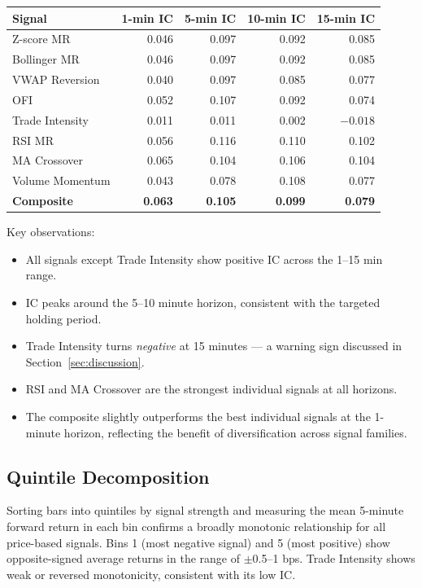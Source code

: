 \documentclass[11pt, a4paper]{article}
\begin{document}
\begin{center}
\begin{tabular}{lrrrr}
\toprule
\textbf{Signal} & \textbf{1-min IC} & \textbf{5-min IC}
  & \textbf{10-min IC} & \textbf{15-min IC} \\
\midrule
Z-score MR       & 0.046 & 0.097 & 0.092 & 0.085 \\
Bollinger MR     & 0.046 & 0.097 & 0.092 & 0.085 \\
VWAP Reversion   & 0.040 & 0.097 & 0.085 & 0.077 \\
OFI              & 0.052 & 0.107 & 0.092 & 0.074 \\
Trade Intensity  & 0.011 & 0.011 & 0.002 & \textbf{$-0.018$} \\
RSI MR           & 0.056 & 0.116 & 0.110 & 0.102 \\
MA Crossover     & 0.065 & 0.104 & 0.106 & 0.104 \\
Volume Momentum  & 0.043 & 0.078 & 0.108 & 0.077 \\
\midrule
\textbf{Composite}& \textbf{0.063} & \textbf{0.105} & \textbf{0.099} & \textbf{0.079} \\
\bottomrule
\end{tabular}
\end{center}

Key observations:
\begin{itemize}[leftmargin=2em, itemsep=0pt]
  \item All signals except Trade Intensity show positive IC across the 1--15 min range.
  \item IC peaks around the 5--10 minute horizon, consistent with the targeted
        holding period.
  \item Trade Intensity turns \textit{negative} at 15 minutes --- a warning sign
        discussed in Section~\ref{sec:discussion}.
  \item RSI and MA Crossover are the strongest individual signals at all horizons.
  \item The composite slightly outperforms the best individual signals at the
        1-minute horizon, reflecting the benefit of diversification across signal families.
\end{itemize}

\subsection{Quintile Decomposition}

Sorting bars into quintiles by signal strength and measuring the mean
5-minute forward return in each bin confirms a broadly monotonic relationship
for all price-based signals.  Bins 1 (most negative signal) and 5 (most positive)
show opposite-signed average returns in the range of $\pm$0.5--1 bps.  Trade
Intensity shows weak or reversed monotonicity, consistent with its low IC.
\end{document}
